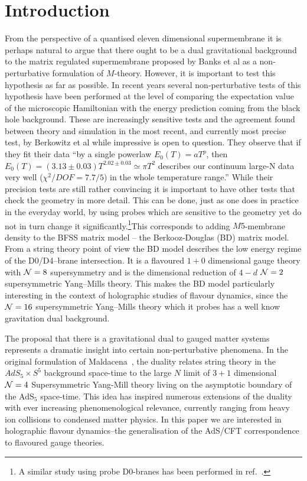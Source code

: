 \documentclass[a4paper]{jpconf}
\begin{document}
\section{Introduction}
From the perspective of a quantised eleven dimensional supermembrane
it is perhaps natural to argue that there ought to be a dual
gravitational background to the matrix regulated supermembrane
proposed by Banks et al \cite{Banks:1996vh} as a non-perturbative
formulation of $M$-theory.  However, it is important to test this
hypothesis as far as possible.  In recent years several
non-perturbative tests of this hypothesis have been performed
\cite{Anagnostopoulos:2007fw,Catterall:2008yz,Hanada:2008ez,Hanada:2013rga,Kadoh:2015mka,Filev:2015hia,Hanada:2016zxj,Berkowitz:2016jlq}
at the level of comparing the expectation value of the microscopic
Hamiltonian with the energy prediction coming from the black hole
background. These are increasingly sensitive tests and the agreement
found between theory and simulation in the most recent, and currently
most precise test, by Berkowitz et al \cite{Berkowitz:2016jlq} while
impressive is open to question. They observe that if they fit their
data ``by a single powerlaw $E_0(T)=a T^p$, then $E_0(T)= (3.13\pm
0.03) T^{2.02\pm0.03} \simeq\pi T^2$ describes our continuum large-N
data very well ($\chi^2/DOF = 7.7/5$) in the whole temperature
range.'' While their precision tests are still rather convincing it is
important to have other tests that check the geometry in more detail.
This can be done, just as one does in practice in the everyday world,
by using probes which are sensitive to the geometry yet do not in turn
change it significantly.\footnote{A similar study using probe
  D0-branes has been performed in ref.~\cite{Rinaldi:2017mjl}. }This
corresponds to adding $M5$-membrane density to the BFSS matrix model
-- the Berkooz-Douglas (BD) matrix model. From a string theory point
of view the BD model describes the low energy regime of the
D0/D4--brane intersection. It is a flavoured $1+0$ dimensional
gauge theory with ${\cal N}=8$ supersymmetry and is the dimensional
reduction of $4-d$  ${\cal N}=2$ supersymmetric Yang--Mills theory.
This makes the BD model particularly interesting in the context of holographic
studies of flavour dynamics, since the ${\cal  N}=16$ supersymmetric
Yang--Mills theory which it probes has a well know gravitation dual
background.


The proposal that there is a gravitational dual to gauged matter
systems represents a dramatic insight into certain non-perturbative
phenomena. In the original formulation of Maldacena~\cite{Maldacena:1997re}, 
the duality relates string theory in the $AdS_5\times S^5$ background space-time 
to the large $N$ limit of $3+1$ dimensional ${\cal N}=4$ Supersymmetric Yang-Mill
theory living on the asymptotic boundary of the AdS$_5$
space-time. This idea has inspired numerous extensions of the duality
with ever increasing phenomenological relevance, currently ranging
from heavy ion collisions to condensed matter physics. In this paper
we are interested in holographic flavour dynamics--the generalisation
of the AdS/CFT correspondence to flavoured gauge theories.
\end{document}
